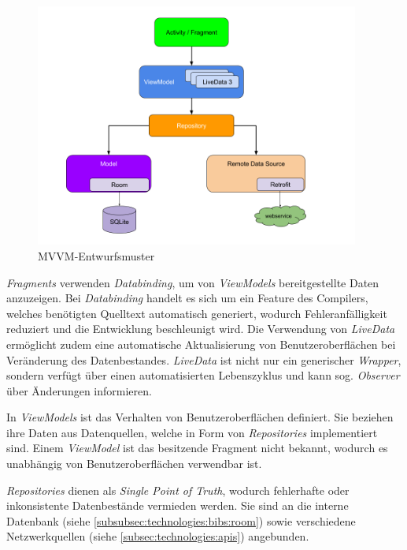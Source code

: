 \documentclass[a4paper]{article}
\begin{document}
\begin{figure}[H]
	\centering
	\includegraphics[height=8cm,keepaspectratio]{./images/mvvm-architecture.png}
	\caption{MVVM-Entwurfsmuster \autocite{mvvm_architecture}}
	\label{fig:technologies:architecture:mvvm}
\end{figure}

\textit{Fragments} verwenden \textit{Databinding}, um von \textit{ViewModels} bereitgestellte Daten anzuzeigen.
Bei \textit{Databinding} handelt es sich um ein Feature des Compilers, welches benötigten Quelltext automatisch generiert, wodurch Fehleranfälligkeit reduziert und die Entwicklung beschleunigt wird.
Die Verwendung von \textit{LiveData} ermöglicht zudem eine automatische Aktualisierung von Benutzeroberflächen bei Veränderung des Datenbestandes.
\textit{LiveData} ist nicht nur ein generischer \textit{Wrapper}, sondern verfügt über einen automatisierten Lebenszyklus und kann sog. \textit{Observer} über Änderungen informieren.

In \textit{ViewModels} ist das Verhalten von Benutzeroberflächen definiert. Sie beziehen ihre Daten aus Datenquellen, welche in Form von \textit{Repositories} implementiert sind.
Einem \textit{ViewModel} ist das besitzende Fragment nicht bekannt, wodurch es unabhängig von Benutzeroberflächen verwendbar ist.

\textit{Repositories} dienen als \textit{Single Point of Truth}, wodurch fehlerhafte oder inkonsistente Datenbestände vermieden werden.
Sie sind an die interne Datenbank (siehe \autoref{subsubsec:technologies:bibs:room}) sowie verschiedene Netzwerkquellen (siehe \autoref{subsec:technologies:apis}) angebunden.
\end{document}
